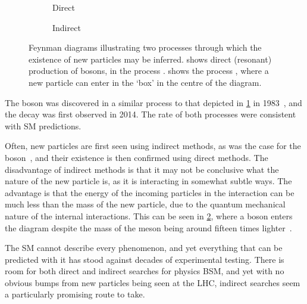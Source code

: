 \begin{figure}
  \begin{subfigure}[b]{0.4\textwidth}
    \centering
    
    \caption{Direct}
    \label{fig:intro:sm:particle_production:direct}
  \end{subfigure}
  \begin{subfigure}[b]{0.6\textwidth}
    \centering
    
    \caption{Indirect}
    \label{fig:intro:sm:particle_production:indirect}
  \end{subfigure}
  \caption{%
    Feynman diagrams illustrating two processes through which the existence of 
    new particles may be inferred.
     shows direct (resonant) 
    production of \PZ bosons, in the process 
    \decay{\Pelectron\APelectron}{\Pmuon\APmuon}.
     shows the process 
    \decay{\PBs}{\Pmuon\APmuon}, where a new particle can enter in the `box' in 
    the centre of the diagram.
  }
  \label{fig:intro:sm:particle_production}
\end{figure}

The \PZ boson was discovered in a similar process to that depicted in 
\cref{fig:intro:sm:particle_production:direct} in 
1983~\cite{1983398,BAGNAIA1983130}, and the decay \decay{\PBs}{\Pmuon\APmuon} 
was first observed in 2014.
The rate of both processes were consistent with \ac{SM} predictions.

Often, new particles are first seen using indirect methods, as was the case for 
the \PZ boson~\cite{HASERT1973138}, and their existence is then confirmed using 
direct methods.
The disadvantage of indirect methods is that it may not be conclusive what the 
nature of the new particle is, as it is interacting in somewhat subtle ways.
The advantage is that the energy of the incoming particles in the interaction 
can be much less than the mass of the new particle, due to the quantum 
mechanical nature of the internal interactions.
This can be seen in \cref{fig:intro:sm:particle_production:indirect}, where a 
\PW boson enters the diagram despite the mass of the \PBs meson being around 
fifteen times lighter~\cite{PDG2014}.

The \ac{SM} cannot describe every phenomenon, and yet everything that can be
predicted with it has stood against decades of experimental testing.
There is room for both direct and indirect searches for physics \acl{BSM}, and 
yet with no obvious bumps from new particles being seen at the \ac{LHC}, 
indirect searches seem a particularly promising route to take.
